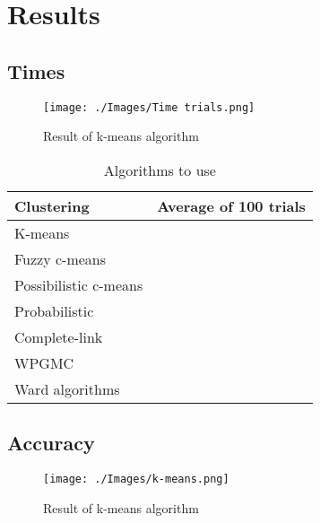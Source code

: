 \documentclass[12pt, a4paper]{article}
\begin{document}
\section{Results}

\subsection{Times}

\begin{figure}[H]
    \begin{center}
        \texttt{[image: ./Images/Time trials.png]}
    \end{center}
    \caption{Result of k-means algorithm}\label{fig:Times}
\end{figure}

\begin{table}[H]
    \caption{Algorithms to use}\label{tab:Times}
    \begin{center}
        \begin{tabular}{l|l}
            \hline
            \textbf{Clustering} & \textbf{Average of 100 trials} \\
            \hline
                K-means & \\
                Fuzzy c-means & \\
                Possibilistic c-means & \\
                Probabilistic & \\
                Complete-link & \\
                WPGMC & \\
                Ward algorithms & \\
            \hline
        \end{tabular}
    \end{center}
\end{table}

\subsection{Accuracy}

\begin{figure}[H]
    \begin{center}
        \texttt{[image: ./Images/k-means.png]}
    \end{center}
    \caption{Result of k-means algorithm}\label{fig:means}
\end{figure}
\end{document}
